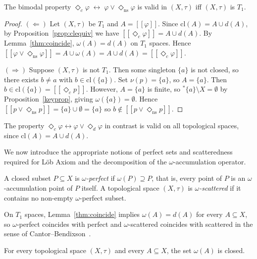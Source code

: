 \documentclass[submission,copyright,creativecommons]{eptcs}
\newcommand{\cl}{\mathrm{cl}}
\newcommand{\sem}[1]{[\![#1]\!]}
\newcommand{\diam}{\Diamond}
\newcommand{\str}{{{}^{*}\!}}
\newcommand{\lozengens}{\diam_\mathrm{ns}}
\begin{document}
\begin{proposition}
\label{prop:T1char}
The bimodal property
  $\diam_c\varphi \;\leftrightarrow\; \varphi \vee \lozengens\varphi$
is valid in $(X,\tau)$ iff $(X,\tau)$ is $T_1$.
\end{proposition}

\begin{proof}
$(\Leftarrow)$
Let $(X,\tau)$ be $T_1$ and $A = \sem{\varphi}$.
Since $\cl(A) = A \cup d(A)$, by Proposition~\ref{prop:clequiv} we have 
$\sem{\diam_c\varphi} = A \cup d(A)$.
By Lemma~\ref{thm:coincide}, $\omega(A) = d(A)$ on $T_1$ spaces.
Hence $\sem{\varphi \vee \lozengens\varphi}
  = A \cup \omega(A)
  = A \cup d(A)
  = \sem{\diam_c\varphi}$.

$(\Rightarrow)$
Suppose $(X,\tau)$ is not $T_1$. Then some singleton $\{a\}$ is not closed,
so there exists $b \neq a$ with $b \in \cl(\{a\})$.
Set $\nu(p) = \{a\}$, so $A = \{a\}$.
Then $b \in \cl(\{a\}) = \sem{\diam_c p}$.
However, $A = \{a\}$ is finite, so $\str\{a\} \setminus X = \emptyset$
by Proposition~\ref{keyprop}, giving $\omega(\{a\}) = \emptyset$.
Hence $\sem{p \vee \lozengens p} = \{a\} \cup \emptyset = \{a\}$
so $b \notin \sem{p \vee \lozengens p}$.
\end{proof}
The property
$\diam_c\varphi \leftrightarrow \varphi \vee \diam_d\varphi$ in contrast is valid on all topological spaces, since $\cl(A)=A\cup d(A)$.

We now introduce the appropriate notions of perfect sets and scatteredness required for L\"ob Axiom and the decomposition of the $\omega$-accumulation operator.
\begin{definition}
\label{def:omegaperf}
A closed subset $P \subseteq X$ is \emph{$\omega$-perfect} if $\omega(P) \supseteq P$,
that is, every point of $P$ is an $\omega$-accumulation point of $P$ itself.
A topological space $(X,\tau)$ is \emph{$\omega$-scattered} if it contains no non-empty $\omega$-perfect subset.
\end{definition}

On $T_1$ spaces, Lemma~\ref{thm:coincide} implies $\omega(A) = d(A)$ for every $A \subseteq X$, so $\omega$-perfect coincides with perfect and $\omega$-scattered coincides with scattered in the sense of Cantor--Bendixson~\cite{Kechris1995}.

\begin{lemma}
\label{lem:omegaclosed}
For every topological space $(X,\tau)$ and every $A \subseteq X$, the set $\omega(A)$ is closed.
\end{lemma}
\end{document}
